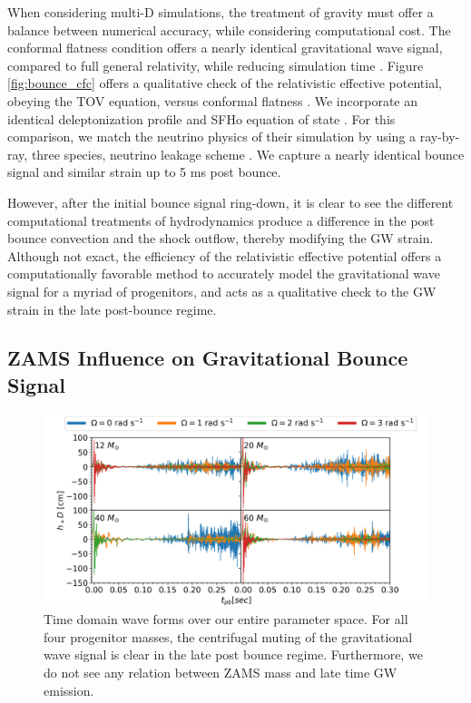 \documentclass[twocolumn,times]{aastex62}  %
\begin{document}
When considering multi-D simulations, the treatment of gravity must offer a balance between numerical accuracy, while considering computational cost.   The conformal flatness condition offers a nearly identical gravitational wave signal, compared to full general relativity, while reducing simulation time \citep{ott:2007}.  Figure \ref{fig:bounce_cfc} offers a qualitative check of the relativistic effective potential, obeying the TOV equation, versus conformal flatness \citep{marek:2006,richers:2017}.  We incorporate an identical deleptonization profile and SFHo equation of state \citep{steiner:2013}.  For this comparison, we match the neutrino physics of their simulation by using a ray-by-ray, three species, neutrino leakage scheme \cite{oconnor:2010,couch:2014}.  We capture a nearly identical bounce signal and similar strain up to 5 ms post bounce. \par
However, after the initial bounce signal ring-down, it is clear to see the different computational treatments of hydrodynamics produce a difference in the post bounce convection and the shock outflow, thereby modifying the GW strain.  Although not exact, the efficiency of the relativistic effective potential offers a computationally favorable method to accurately model the gravitational wave signal for a myriad of progenitors, and acts as a qualitative check to the GW strain in the late post-bounce regime.\\




\subsection{ZAMS Influence on Gravitational Bounce Signal}

\begin{figure}[t]
\includegraphics[width=\textwidth]{figures/ccsn2D_M1_all.png}
\centering
\caption{Time domain wave forms over our entire parameter space.  For all four progenitor masses, the centrifugal muting of the gravitational wave signal is clear in the late post bounce regime.    Furthermore, we do not see any relation between ZAMS mass and late time GW emission.}
\label{fig:ccsn_all}
\end{figure}
\end{document}
